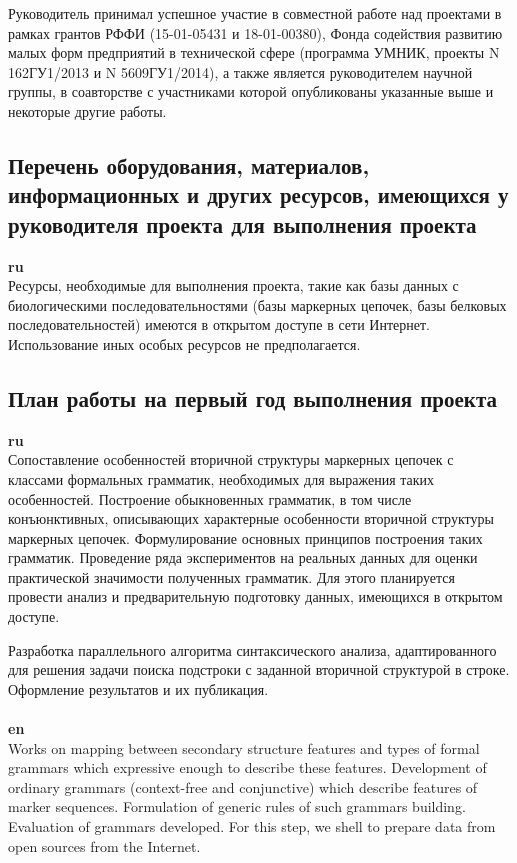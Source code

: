 \documentclass[12pt]{article}  %
\theoremstyle{remark}
\begin{document}
Руководитель принимал успешное участие в совместной работе над проектами в рамках грантов РФФИ (15-01-05431 и 18-01-00380), Фонда содействия развитию малых форм предприятий в технической сфере
(программа УМНИК, проекты N 162ГУ1/2013 и N 5609ГУ1/2014), а также является руководителем научной группы, в соавторстве с участниками которой опубликованы указанные выше и некоторые другие работы.

\subsection{Перечень оборудования, материалов, информационных и других ресурсов, имеющихся у руководителя проекта для выполнения проекта }
\textbf{ru}\\
Ресурсы, необходимые для выполнения проекта, такие как базы данных с биологическими последовательностями (базы маркерных цепочек, базы белковых последовательностей) имеются в открытом доступе в сети Интернет.
Использование иных особых ресурсов не предполагается.


\subsection{План работы на первый год выполнения проекта}

\textbf{ru}\\
Сопоставление особенностей вторичной структуры маркерных цепочек с классами формальных грамматик, необходимых для выражения таких особенностей. Построение обыкновенных грамматик, в том числе конъюнктивных, описывающих характерные особенности вторичной структуры маркерных цепочек.
Формулирование основных принципов построения таких грамматик.
Проведение ряда экспериментов на реальных данных для оценки практической значимости полученных грамматик. Для этого планируется провести анализ и предварительную подготовку данных, имеющихся в открытом доступе.

Разработка параллельного алгоритма синтаксического анализа, адаптированного для решения задачи поиска подстроки с заданной вторичной структурой в строке.
Оформление результатов и их публикация.
\\
\\
\textbf{en}\\
Works on mapping between secondary structure features and types of formal grammars which expressive enough to describe these features.
Development of ordinary grammars (context-free and conjunctive) which describe features of marker sequences.
Formulation of generic rules of such grammars building.
Evaluation of grammars developed. For this step, we shell to prepare data from open sources from the Internet.
\end{document}
